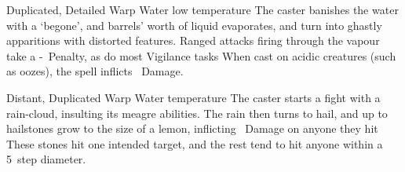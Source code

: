 \ifodd\value{diceNo}

  {Duplicated, Detailed}%
  {Warp}%
  {Water}%
  {low temperature}%
  {The caster banishes the water with a `begone', and  barrels' worth of liquid evaporates, and turn into ghastly apparitions with distorted features.
  Ranged attacks firing through the vapour take a -~Penalty, as do most Vigilance tasks}%
  {
  When cast on acidic creatures (such as oozes), the spell inflicts \showDam\ Damage.}

\else

  {Distant, Duplicated}%
  {Warp}%
  {Water}%
  {temperature}%
  {The caster starts a fight with a rain-cloud, insulting its meagre abilities.
  The rain then turns to hail, and up to  hailstones grow to the size of a lemon, inflicting \showDam~Damage on anyone they hit}%
  {These stones hit one intended target, and the rest tend to hit anyone within a 5~\gls{step} diameter.}

\fi
{}
